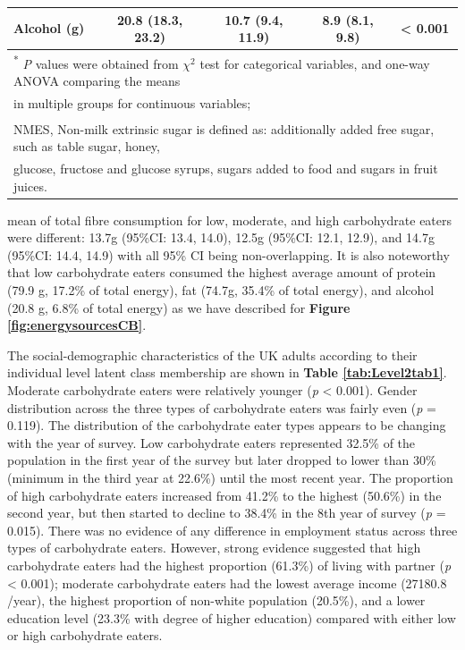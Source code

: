 \begin{table}[H]
\begin{tabular}[t]{lcccc}
		Alcohol (g) & 20.8 (18.3, 23.2) & 10.7 (9.4, 11.9) & 8.9 (8.1, 9.8) & < 0.001\\
		\bottomrule
		\multicolumn{5}{l}{{\scriptsize \textsuperscript{*} \textit{P} values were obtained from $\chi^2$ test for categorical variables, and one-way ANOVA comparing the means}}\\
		\multicolumn{5}{l}{{\scriptsize  in multiple groups for continuous variables;}}\\
		\multicolumn{5}{l}{{\scriptsize \textsuperscript{\dag} NMES, Non-milk extrinsic sugar is defined as: additionally added free sugar, such as table sugar, honey, }}\\
		\multicolumn{5}{l}{{\scriptsize glucose, fructose and glucose syrups, sugars added to food and sugars in fruit juices.}}\\
	\end{tabular}
\end{table}


mean of total fibre consumption for low, moderate, and high carbohydrate eaters were different: 13.7g (95\%CI: 13.4, 14.0), 12.5g (95\%CI: 12.1, 12.9), and 14.7g (95\%CI: 14.4, 14.9) with all 95\% CI being non-overlapping. It is also noteworthy that low carbohydrate eaters consumed the highest average amount of protein (79.9 g, 17.2\% of total energy), fat (74.7g, 35.4\% of total energy), and alcohol (20.8 g, 6.8\% of total energy) as we have described for \textbf{Figure \ref{fig:energysourcesCB}}. 
 
The social-demographic characteristics of the UK adults according to their individual level latent class membership are shown in \textbf{Table \ref{tab:Level2tab1}}. Moderate carbohydrate eaters were relatively younger (\textit{p} < 0.001). Gender distribution across the three types of carbohydrate eaters was fairly even (\textit{p} = 0.119). The distribution of the carbohydrate eater types appears to be changing with the year of survey. Low carbohydrate eaters represented 32.5\% of the population in the first year of the survey but later dropped to lower than 30\% (minimum in the third year at 22.6\%) until the most recent year. The proportion of high carbohydrate eaters increased from 41.2\% to the highest (50.6\%) in the second year, but then started to decline to 38.4\% in the 8th year of survey (\textit{p} = 0.015). There was no evidence of any difference in employment status across three types of carbohydrate eaters. However, strong evidence suggested that high carbohydrate eaters had the highest proportion (61.3\%) of living with partner (\textit{p} < 0.001); moderate carbohydrate eaters had the lowest average income (27180.8 \textsterling/year), the highest proportion of non-white population (20.5\%), and a lower education level (23.3\% with degree of higher education) compared with either low or high carbohydrate eaters. 


